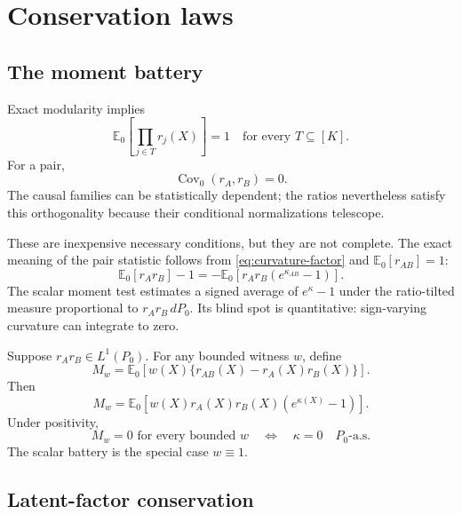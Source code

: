 \documentclass[11pt]{article}
\newcommand{\E}{\mathbb{E}}
\newcommand{\Cov}{\operatorname{Cov}}
\begin{document}
\section{Conservation laws}

\subsection{The moment battery}

Exact modularity implies
\begin{equation}
\boxed{
\E_0\left[\prod_{j\in T}r_j(X)\right]=1
\quad\text{for every }T\subseteq[K].
}
\label{eq:moment-battery}
\end{equation}
For a pair,
\begin{equation}
\Cov_0(r_A,r_B)=0.
\end{equation}
The causal families can be statistically dependent; the ratios nevertheless satisfy this orthogonality because their conditional normalizations telescope.

These are inexpensive necessary conditions, but they are not complete.  The exact meaning of the pair statistic follows from \eqref{eq:curvature-factor} and \(\E_0[r_{AB}]=1\):
\begin{equation}
\boxed{
\E_0[r_A r_B]-1
=
-\E_0\left[r_A r_B(e^{\kappa_{AB}}-1)\right].
}
\label{eq:curvature-balance}
\end{equation}
The scalar moment test estimates a signed average of \(e^\kappa-1\) under the ratio-tilted measure proportional to \(r_A r_B\,dP_0\).  Its blind spot is quantitative: sign-varying curvature can integrate to zero.

Suppose \(r_A r_B\in L^1(P_0)\).  For any bounded witness \(w\), define
\begin{equation}
M_w
=
\E_0\left[w(X)\{r_{AB}(X)-r_A(X)r_B(X)\}\right].
\label{eq:Mw}
\end{equation}
Then
\begin{equation}
M_w=
\E_0\left[w(X)r_A(X)r_B(X)(e^{\kappa(X)}-1)\right].
\label{eq:Mw-curvature}
\end{equation}
Under positivity,
\begin{equation}
M_w=0\text{ for every bounded }w
\quad\Longleftrightarrow\quad
\kappa=0\quad P_0\text{-a.s.}
\end{equation}
The scalar battery is the special case \(w\equiv1\).

\subsection{Latent-factor conservation}
\end{document}

